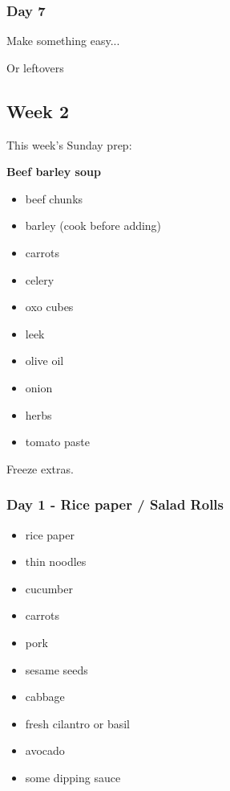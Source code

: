 \documentclass[11pt, a4paper]{article}
\begin{document}
\subsubsection{Day 7}
\vspace{1pc}
\noindent Make something easy...
\par
Or leftovers


\vspace{0.917 pc} %

\pagebreak
\subsection{Week 2}

This week's Sunday prep:
\par
\vspace{1pc}
\noindent\textbf{Beef barley soup}
\par
\begin{itemize}
\item beef chunks
\item barley (cook before adding)
\item carrots
\item celery
\item oxo cubes
\item leek
\item olive oil
\item onion
\item herbs
\item tomato paste
\end{itemize}
Freeze extras.

\subsubsection{Day 1 - Rice paper / Salad Rolls}
\vspace{1pc}
\begin{itemize}
\item rice paper
\item thin noodles 
\item cucumber
\item carrots
\item pork
\item sesame seeds
\item cabbage
\item fresh cilantro or basil
\item avocado
\item some dipping sauce
\end{itemize}
\end{document}
